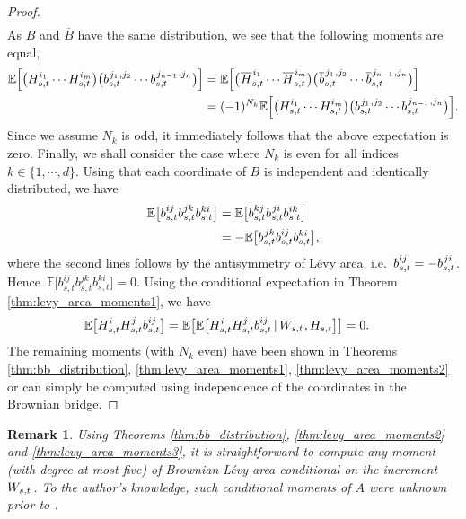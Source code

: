 \documentclass[sn-mathphys-num]{sn-jnl}%
\newtheorem{remark}{Remark}%
\newcommand{\E}{\mathbb{E}}
\newcommand{\m}{\hspace{0.25mm}}
\begin{document}
\begin{proof}
\begin{align*}
\end{align*}
As $B$ and $\overline{B}$ have the same distribution, we see that the following moments are equal,
\begin{align*}
\E\Big[\big(H_{s,t}^{i_1}\cdots H_{s,t}^{i_m}\big)\big(b_{s,t}^{\m j_1\m, j_2}\cdots b_{s,t}^{\m j_{n-1}\m, j_n}\big)\Big] & = \E\Big[\big(\m\overline{H}_{s,t}^{\m i_1}\cdots \overline{H}_{s,t}^{\m i_m}\big)\big(\m\overline{b}_{s,t}^{\m j_1\m, j_2}\cdots \overline{b}_{s,t}^{\m j_{n-1}\m, j_n}\big)\Big]\\
& = (-1)^{N_k} \E\Big[\big(H_{s,t}^{i_1}\cdots H_{s,t}^{i_m}\big)\big(b_{s,t}^{\m j_1\m, j_2}\cdots b_{s,t}^{\m j_{n-1}\m, j_n}\big)\Big]. 
\end{align*}
Since we assume $N_k$ is odd, it immediately follows that the above expectation is zero.
Finally, we shall consider the case where $N_k$ is even for all indices $k\in\{1,\cdots, d\}$. Using that each coordinate of $B$ is independent and identically distributed, we have
\begin{align*}
\E\big[b_{s,t}^{ij}b_{s,t}^{jk}b_{s,t}^{ki}\big] & = \E\big[b_{s,t}^{kj}b_{s,t}^{\m ji}b_{s,t}^{ik}\big]\\[2pt]
& = -\E\big[b_{s,t}^{\m jk}b_{s,t}^{ij}b_{s,t}^{ki}\big],
\end{align*}
where the second lines follows by the antisymmetry of L\'{e}vy area, i.e.~$b_{s,t}^{ij} = - b_{s,t}^{\m ji}$.
Hence $\,\E\big[b_{s,t}^{ij}b_{s,t}^{jk}b_{s,t}^{ki}\big] = 0$. Using the conditional expectation in Theorem \ref{thm:levy_area_moments1}, we have
\begin{align*}
\E\big[H_{s,t}^i H_{s,t}^j b_{s,t}^{ij}\big] = \E\big[\E\big[H_{s,t}^i H_{s,t}^j b_{s,t}^{ij} \,|\, W_{s,t}\m, H_{s,t}\big]\big] & = 0.
\end{align*}
The remaining moments (with $N_k$ even) have been shown in Theorems \ref{thm:bb_distribution}, \ref{thm:levy_area_moments1}, \ref{thm:levy_area_moments2} or can simply be computed using independence of the coordinates in the Brownian bridge.
\end{proof}\medbreak
\begin{remark}
Using Theorems \ref{thm:bb_distribution}, \ref{thm:levy_area_moments2} and \ref{thm:levy_area_moments3}, it is straightforward to compute any moment (with degree at most five) of Brownian L\'{e}vy area conditional on the increment $W_{s,t}\m$. To the author's knowledge, such conditional moments of $A$ were unknown prior to \cite{foster2020thesis}.
\end{remark}
\end{document}
